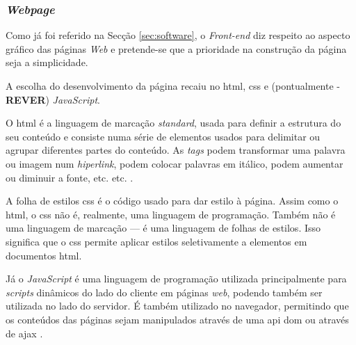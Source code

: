 \subsubsection{\textit{Webpage}}
Como já foi referido na Secção \ref{sec:software}, o \textit{Front-end} diz respeito ao aspecto gráfico das páginas \textit{Web} e pretende-se que a prioridade na construção da página seja a simplicidade.

A escolha do desenvolvimento da página recaiu no \acrshort{html}, \acrshort{css} e (pontualmente - \textbf{REVER}) \textit{JavaScript}.

O \acrshort{html} é a linguagem de marcação \textit{standard}, usada para definir a estrutura do seu conteúdo e consiste numa série de elementos usados para delimitar ou agrupar diferentes partes do conteúdo. As \textit{tags} podem transformar uma palavra ou imagem num \textit{hiperlink}, podem colocar palavras em itálico, podem aumentar ou diminuir a fonte, etc. etc. \cite{HTMLbasics}.

A folha de estilos \acrshort{css} é o código usado para dar estilo à página. Assim como o \acrshort{html}, o \acrshort{css} não é, realmente, uma linguagem de programação. Também não é uma linguagem de marcação — é uma linguagem de folhas de estilos. Isso significa que o \acrshort{css} permite aplicar estilos seletivamente a elementos em documentos \acrshort{html}.

Já o \textit{JavaScript} é uma linguagem de programação utilizada principalmente para \textit{scripts} dinâmicos do lado do cliente em páginas \textit{web}, podendo também ser utilizada no lado do servidor. É também utilizado no navegador, permitindo que os conteúdos das páginas sejam manipulados através de uma \acrshort{api} \acrfull{dom} ou através de \acrfull{ajax} \cite{HTMLbasics}.